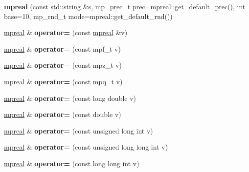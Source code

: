 \begin{DoxyCompactItemize}
{\bfseries mpreal} (const std\+::string \&s, mp\+\_\+prec\+\_\+t prec=mpreal\+::get\+\_\+default\+\_\+prec(), int base=10, mp\+\_\+rnd\+\_\+t mode=mpreal\+::get\+\_\+default\+\_\+rnd())
\item 
\mbox{\label{classmpfr_1_1mpreal_a1699f2ceccfc9425091cc4e580b6d799}} 
\hyperlink{classmpfr_1_1mpreal}{mpreal} \& {\bfseries operator=} (const \hyperlink{classmpfr_1_1mpreal}{mpreal} \&v)
\item 
\mbox{\label{classmpfr_1_1mpreal_a4c89896f01bbe7d73e3f1af7ebd4de3d}} 
\hyperlink{classmpfr_1_1mpreal}{mpreal} \& {\bfseries operator=} (const mpf\+\_\+t v)
\item 
\mbox{\label{classmpfr_1_1mpreal_a146b8d983c0c642fe3e648b223d9995e}} 
\hyperlink{classmpfr_1_1mpreal}{mpreal} \& {\bfseries operator=} (const mpz\+\_\+t v)
\item 
\mbox{\label{classmpfr_1_1mpreal_a7bfa3c0ceedeb72dda02dd2b8c5ba146}} 
\hyperlink{classmpfr_1_1mpreal}{mpreal} \& {\bfseries operator=} (const mpq\+\_\+t v)
\item 
\mbox{\label{classmpfr_1_1mpreal_a601e6c07470897815e9d900d3dcbebca}} 
\hyperlink{classmpfr_1_1mpreal}{mpreal} \& {\bfseries operator=} (const long double v)
\item 
\mbox{\label{classmpfr_1_1mpreal_ab691ed4a075cf08596a1cce0ec8b701f}} 
\hyperlink{classmpfr_1_1mpreal}{mpreal} \& {\bfseries operator=} (const double v)
\item 
\mbox{\label{classmpfr_1_1mpreal_a405fdd2c06bfc3e07a02e8a3a1da72df}} 
\hyperlink{classmpfr_1_1mpreal}{mpreal} \& {\bfseries operator=} (const unsigned long int v)
\item 
\mbox{\label{classmpfr_1_1mpreal_a24a437b9aad42f73fe18ce215b45e6d0}} 
\hyperlink{classmpfr_1_1mpreal}{mpreal} \& {\bfseries operator=} (const unsigned long long int v)
\item 
\mbox{\label{classmpfr_1_1mpreal_a4854f8aec75b2d566725fa3176c53efb}} 
\hyperlink{classmpfr_1_1mpreal}{mpreal} \& {\bfseries operator=} (const long long int v)

\end{DoxyCompactItemize}
